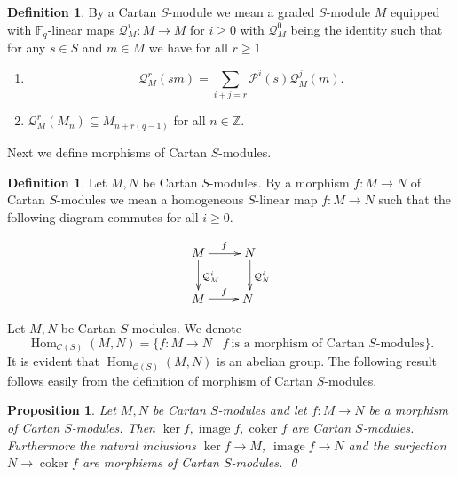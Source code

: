 \documentclass{amsart}
\newcommand{\F}{\mathbb{F} }
\newcommand{\C}{\mathcal{C} }
\newcommand{\Z}{\mathbb{Z} }
\newcommand{\Pc}{\mathcal{P} }
\newcommand{\Qc}{\mathcal{Q} }
\newcommand{\rt}{\rightarrow}
\newcommand{\image}{\operatorname{image}}
\newcommand{\coker}{\operatorname{coker}}
\newcommand{\cHom}{\operatorname{Hom}}
\theoremstyle{plain}
\newtheorem{proposition}[theorem]{Proposition}
\theoremstyle{definition}
\newtheorem{definition}[theorem]{Definition}
\theoremstyle{remark}
\begin{document}
\begin{definition}
By a Cartan $S$-module we mean a graded $S$-module $M$ equipped with $\F_q$-linear maps $\Qc^i_M \colon M \rt M$ for $i \geq 0$ with $\Qc^0_M $ being the identity such that for any $s \in S$ and $m \in M$ we have for all $r \geq 1$
\begin{enumerate}
  \item $$ \Qc^r_M(sm) = \sum_{i+j = r}\Pc^i(s)\Qc^j_M(m).$$
  \item $\Qc^r_M(M_n) \subseteq M_{n + r(q-1)}$ for all $n \in \Z$.
\end{enumerate}
\end{definition}
Next we define morphisms of Cartan $S$-modules.
\begin{definition}\label{def-cart-morph}
  Let $M, N$ be Cartan $S$-modules. By a morphism $f \colon M \rt N$ of Cartan $S$-modules we mean a homogeneous $S$-linear map $f \colon M \rt N$ such that the following diagram commutes for all $i \geq 0$.

\[
  \xymatrix
{
M
\ar@{->}[r]^{f}
\ar@{->}[d]^{\Qc_M^i}
 & N
\ar@{->}[d]^{\Qc_N^i}
\\
M
\ar@{->}[r]^{f}
 & N
\
 }
\]
\end{definition}
\s Let $M, N$ be Cartan $S$-modules. We denote
\[
\cHom_{\C(S)}(M, N) = \{ f \colon M \rt N \mid f \ \text{is a morphism of Cartan $S$-modules}\}.
\]
It is evident that $\cHom_{\C(S)}(M, N)$ is an abelian group.
The following result follows easily from the definition of morphism of Cartan $S$-modules.
\begin{proposition}
\label{kic} Let $M, N$ be Cartan $S$-modules and let $f \colon M \rt N$ be a morphism of Cartan $S$-modules. Then $\ker f, \image f, \coker f$ are Cartan $S$-modules. Furthermore the natural inclusions $\ker f \rt M$, $\image f \rt N$ and the surjection $N \rt \coker f$ are morphisms of Cartan $S$-modules. \qed
\end{proposition}
\end{document}

